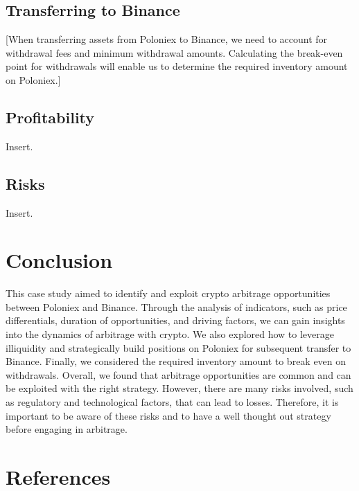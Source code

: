 \documentclass{article}
\begin{document}
\subsection{Transferring to Binance}
[When transferring assets from Poloniex to Binance, we need to account for withdrawal fees and minimum
withdrawal amounts. Calculating the break-even point for withdrawals will enable us to determine the
required inventory amount on Poloniex.]
\subsection{Profitability}
Insert.
\subsection{Risks}
Insert.

\section{Conclusion}
This case study aimed to identify and exploit crypto arbitrage opportunities between Poloniex and Binance. Through the analysis of indicators, such as price differentials, duration of opportunities, and driving factors, we can gain insights into the dynamics of arbitrage with crypto. We also explored how to leverage illiquidity and strategically build positions on Poloniex for subsequent transfer to Binance. Finally, we considered the required inventory amount to break even on withdrawals. Overall, we found that arbitrage opportunities are common and can be exploited with the right strategy. However, there are many risks involved, such as regulatory and technological factors, that can lead to losses. Therefore, it is important to be aware of these risks and to have a well thought out strategy before engaging in arbitrage.

\section{References}
\end{document}

